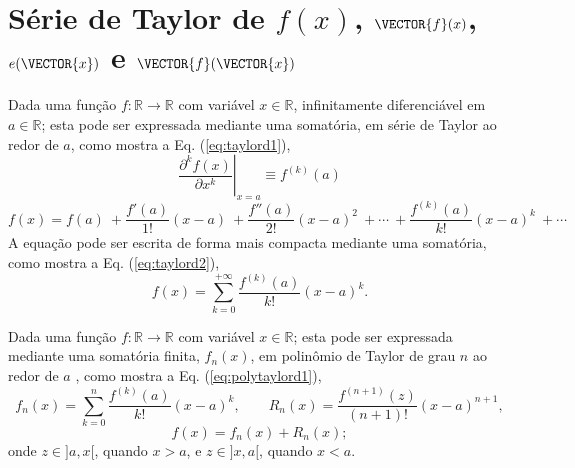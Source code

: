 
\section{Série de Taylor de $f(x)$, $\VECTOR{f}(x)$, $e(\VECTOR{x})$ e $\VECTOR{f}(\VECTOR{x})$}
\label{def:taylor}


\begin{proposition}\label{prop:taylord}
Dada uma função $f:\mathbb{R}\rightarrow \mathbb{R}$ com variável $x \in \mathbb{R}$,
infinitamente diferenciável em $a \in \mathbb{R}$;
esta pode ser expressada mediante uma somatória, em série de Taylor 
\cite[pp. 734]{stewart2008calculus} \cite[pp. 281]{telles2015matematica} \cite{Taylor} 
ao redor de $a$, como
mostra a Eq. (\ref{eq:taylord1}),%
\begin{equation}\label{eq:taylord0a}
\left.\frac{\partial^k f(x)}{\partial x^k}\right|_{x=a}\equiv f^{(k)}(a) 
\end{equation}
\begin{equation}\label{eq:taylord1}
  f(x)=f(a)
      ~+\frac{f'(a)}{1!} (x-a)
      ~+\frac{f''(a)}{2!} (x-a)^{2}
      ~+\cdots 
      ~+\frac{f^{(k)}(a)}{k!} (x-a)^{k}
      ~+\cdots 
\end{equation}
A equação pode ser escrita de forma mais compacta mediante uma somatória, como mostra a Eq. (\ref{eq:taylord2}),
\begin{equation}\label{eq:taylord2}
  f(x)=\sum\limits_{k=0}^{+\infty} \frac{f^{(k)}(a)}{k!} (x-a)^{k}.
\end{equation}
\end{proposition}

\begin{proposition}\label{prop:polytaylor}
Dada uma função $f:\mathbb{R}\rightarrow \mathbb{R}$ com variável $x \in \mathbb{R}$;
esta pode ser expressada mediante uma somatória finita, $f_n(x)$, 
em polinômio de Taylor de grau $n$ ao redor de $a$
\cite[pp. 737]{stewart2008calculus} \cite[pp. 285]{telles2015matematica}, 
 como mostra a Eq. (\ref{eq:polytaylord1}),
\begin{equation}\label{eq:polytaylord1}
  f_n(x)=\sum\limits_{k=0}^{n} \frac{f^{(k)}(a)}{k!} (x-a)^{k},
\qquad
R_n(x)=\frac{f^{(n+1)}(z)}{(n+1)!} (x-a)^{n+1},
\end{equation}
\begin{equation}\label{eq:polytaylord2}
f(x)= f_n(x) + R_n(x);
\end{equation}
onde $z \in ]a,x[$, quando $x>a$, e $z \in ]x,a[$, quando $x<a$.
\end{proposition}


